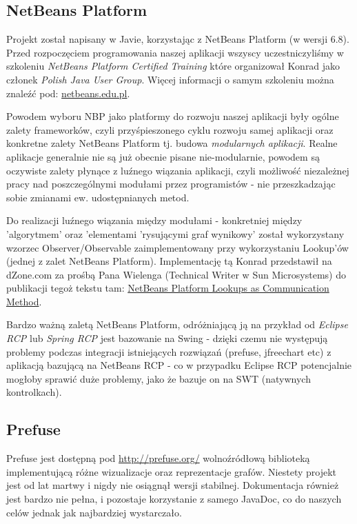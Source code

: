 \documentclass[a4paper]{article}
\begin{document}
\subsection{NetBeans Platform}
Projekt został napisany w Javie, korzystając z NetBeans Platform (w wersji 6.8). Przed rozpoczęciem programowania naszej aplikacji wszyscy uczestniczyliśmy w szkoleniu \textit{NetBeans Platform Certified Training} które organizował Konrad jako członek \textit{Polish Java User Group}. Więcej informacji o samym szkoleniu można znaleźć pod: \href{http://www.netbeans.edu.pl}{netbeans.edu.pl}.

Powodem wyboru NBP jako platformy do rozwoju naszej aplikacji były ogólne zalety frameworków, czyli przyśpieszonego cyklu rozwoju samej aplikacji oraz konkretne zalety NetBeans Platform tj. budowa \textit{modularnych aplikacji}. Realne aplikacje generalnie nie są już obecnie pisane nie-modularnie, powodem są oczywiste zalety płynące z luźnego wiązania aplikacji, czyli możliwość niezależnej pracy nad poszczególnymi modułami przez programistów - nie przeszkadzając sobie zmianami ew. udostępnianych metod. 

Do realizacji luźnego wiązania między modułami - konkretniej między 'algorytmem' oraz 'elementami 'rysującymi graf wynikowy' został wykorzystany wzorzec Observer/Observable zaimplementowany przy wykorzystaniu Lookup'ów (jednej z zalet NetBeans Platform). Implementację tą Konrad przedstawił na dZone.com za prośbą Pana Wielenga (Technical Writer w Sun Microsystems) do publikacji tegoż tekstu tam: \href{http://netbeans.dzone.com/articles/netbeans-platform-lookups}{NetBeans Platform Lookups as Communication Method}.

Bardzo ważną zaletą NetBeans Platform, odróżniającą ją na przykład od \textit{Eclipse RCP} lub \textit{Spring RCP} jest bazowanie na Swing - dzięki czemu nie występują problemy podczas integracji istniejących rozwiązań (prefuse, jfreechart etc) z aplikacją bazującą na NetBeans RCP - co w przypadku Eclipse RCP potencjalnie mogłoby sprawić duże problemy, jako że bazuje on na SWT (natywnych kontrolkach).

\subsection{Prefuse}
Prefuse jest dostępną pod \href{http://prefuse.org/}{http://prefuse.org/} wolnoźródłową biblioteką implementującą różne wizualizacje oraz reprezentacje grafów. Niestety projekt jest od lat martwy i nigdy nie osiągnął wersji stabilnej. Dokumentacja również jest bardzo nie pełna, i pozostaje korzystanie z samego JavaDoc, co do naszych celów jednak jak najbardziej wystarczało. 
\end{document}
